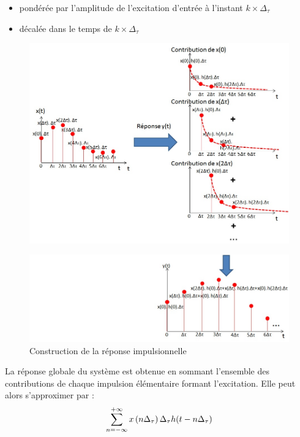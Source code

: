 	\begin{itemize}
        \item pondérée par l'amplitude de l'excitation d'entrée à
          l'instant $ k \times \Delta_\tau $
	
        \item décalée dans le temps de $ k \times \Delta_\tau $~
	\end{itemize}
	\begin{figure}[htbp]
          \centering
          \includegraphics[scale=0.5]{images/illustration_reponse_impuls.jpg}
	\end{figure}
	\begin{figure}[htbp]
          \centering
          \includegraphics[scale=0.6]{images/illustration_reponse_impuls_2.jpg}
          \caption{Construction de la réponse impulsionnelle}
          \label{Fig:illustration_reponse_impuls_2}
	\end{figure}

	La réponse globale du système est obtenue en sommant
        l'ensemble des contributions de chaque impulsion élémentaire
        formant l'excitation. Elle peut alors s'approximer par :
	\begin{equation*}\label{key}
          \sum_{n=-\infty}^{+\infty} x\left(n\Delta_\tau\right)  \Delta_\tau  h(t-n\Delta_\tau)
	\end{equation*}
	
